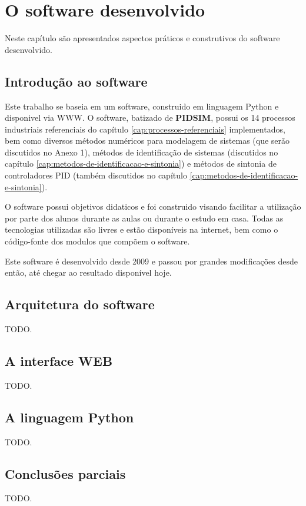 \chapter{O software desenvolvido \label{cap:software}}

Neste capítulo são apresentados aspectos práticos e construtivos do
software desenvolvido.

\section{Introdução ao software}

    Este trabalho se baseia em um software, construido em linguagem Python
    e disponivel via \ac{WWW}. O software, batizado de \textbf{PIDSIM},
    possui os 14 processos industriais referenciais do capítulo
    \ref{cap:processos-referenciais} implementados, bem como diversos
    métodos numéricos para modelagem de sistemas (que serão discutidos no
    Anexo 1), métodos de identificação de sistemas (discutidos no capítulo
    \ref{cap:metodos-de-identificacao-e-sintonia}) e métodos de sintonia de
    controladores \acs{PID} (também discutidos no capítulo
    \ref{cap:metodos-de-identificacao-e-sintonia}).

    O software possui objetivos didaticos e foi construido visando facilitar a
    utilização por parte dos alunos durante as aulas ou durante o estudo em casa.
    Todas as tecnologias utilizadas são livres e estão disponíveis na internet,
    bem como o código-fonte dos modulos que compõem o software.

    Este software é desenvolvido desde 2009 e passou por grandes modificações
    desde então, até chegar ao resultado disponível hoje.

\section{Arquitetura do software}

    TODO.

\section{A interface WEB}

    TODO.

\section{A linguagem Python}

    TODO.

\section{Conclusões parciais}

    TODO.
